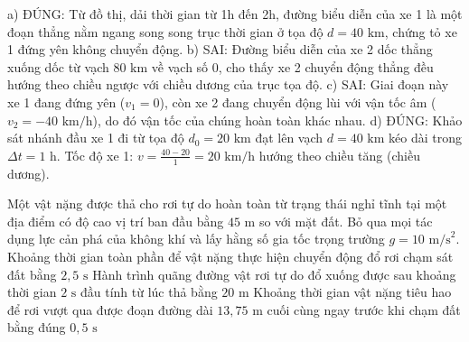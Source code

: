 \begin{ex}
{\begin{itemchoice}
			\itemch a) ĐÚNG: Từ đồ thị, dải thời gian từ 1h đến 2h, đường biểu diễn của xe 1 là một đoạn thẳng nằm ngang song song trục thời gian ở tọa độ $d = 40\text{ km}$, chứng tỏ xe 1 đứng yên không chuyển động.
			\itemch b) SAI: Đường biểu diễn của xe 2 dốc thẳng xuống dốc từ vạch $80\text{ km}$ về vạch số $0$, cho thấy xe 2 chuyển động thẳng đều hướng theo chiều ngược với chiều dương của trục tọa độ.
			\itemch c) SAI: Giai đoạn này xe 1 đang đứng yên ($v_1 = 0$), còn xe 2 đang chuyển động lùi với vận tốc âm ($v_2 = -40\text{ km/h}$), do đó vận tốc của chúng hoàn toàn khác nhau.
			\itemch d) ĐÚNG: Khảo sát nhánh đầu xe 1 đi từ tọa độ $d_0 = 20\text{ km}$ đạt lên vạch $d = 40\text{ km}$ kéo dài trong $\Delta t = 1\text{ h}$. Tốc độ xe 1: $v = \frac{40 - 20}{1} = 20\text{ km/h}$ hướng theo chiều tăng (chiều dương).
		\end{itemchoice}
	}
\end{ex}

\begin{ex}%
	Một vật nặng được thả cho rơi tự do hoàn toàn từ trạng thái nghỉ tĩnh tại một địa điểm có độ cao vị trí ban đầu bằng $45\text{ m}$ so với mặt đất. Bỏ qua mọi tác dụng lực cản phá của không khí và lấy hằng số gia tốc trọng trường $g = 10\text{ m/s}^2$.
	{Khoảng thời gian toàn phần để vật nặng thực hiện chuyển động đổ rơi chạm sát đất bằng $2,5\text{ s}$}
	{\True Hành trình quãng đường vật rơi tự do đổ xuống được sau khoảng thời gian $2\text{ s}$ đầu tính từ lúc thả bằng $20\text{ m}$}
	{\True Khoảng thời gian vật nặng tiêu hao để rơi vượt qua được đoạn đường dài $13,75\text{ m}$ cuối cùng ngay trước khi chạm đất bằng đúng $0,5\text{ s}$}
\end{ex}


